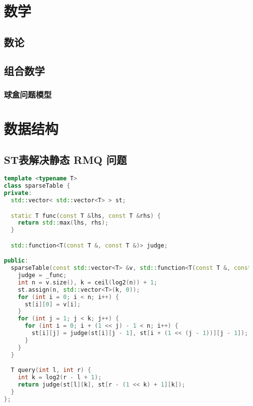 \documentclass[a4paper,10pt]{article}
\begin{document}
\newpage
\section{数学}
\subsection{数论}
\subsection{组合数学}
\subsubsection{球盒问题模型}
\begin{table}[!ht]


\end{table}


\newpage
\section{数据结构}
\subsection{ST表解决静态 RMQ 问题}
\begin{lstlisting}[language=c++]
template <typename T>
class sparseTable {
private:
  std::vector< std::vector<T> > st; 

  static T func(const T &lhs, const T &rhs) {
    return std::max(lhs, rhs);
  }

  std::function<T(const T &, const T &)> judge;

public:
  sparseTable(const std::vector<T> &v, std::function<T(const T &, const T &)> _func = func) {
    judge = _func; 
    int n = v.size(), k = ceil(log2(n)) + 1; 
    st.assign(n, std::vector<T>(k, 0));
    for (int i = 0; i < n; i++) {
      st[i][0] = v[i];
    } 
    for (int j = 1; j < k; j++) {
      for (int i = 0; i + (1 << j) - 1 < n; i++) {
        st[i][j] = judge(st[i][j - 1], st[i + (1 << (j - 1))][j - 1]); 
      }
    }
  }

  T query(int l, int r) {
    int k = log2(r - l + 1); 
    return judge(st[l][k], st[r - (1 << k) + 1][k]); 
  }
};
\end{lstlisting}
\end{document}
